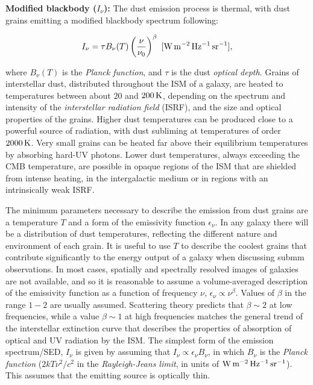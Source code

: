 \documentclass[a4paper,10pt]{article}
\begin{document}
{\noindent}\textbf{Modified blackbody ($I_\nu$):} The dust emission process is thermal, with dust grains emitting a modified blackbody spectrum following:

\begin{align*}
    I_\nu = \tau B_\nu(T) \left(\frac{\nu}{\nu_0}\right)^\beta ~ [{\rm W\,m^{-2}\,Hz^{-1}\,sr^{-1}}],
\end{align*}

{\noindent}where $B_\nu(T)$ is the \textit{Planck function}, and $\tau$ is the dust \textit{optical depth}. Grains of interstellar dust, distributed throughout the ISM of a galaxy, are heated to temperatures between about $20$ and $200\,{\rm K}$, depending on the spectrum and intensity of the \textit{interstellar radiation field} (ISRF), and the size and optical properties of the grains. Higher dust temperatures can be produced close to a powerful source of radiation, with dust subliming at temperatures of order $2000\,{\rm K}$. Very small grains can be heated far above their equilibrium temperatures by absorbing hard-UV photons. Lower dust temperatures, always exceeding the CMB temperature, are possible in opaque regions of the ISM that are shielded from intense heating, in the intergalactic medium or in regions with an intrinsically weak ISRF.

{\noindent}The minimum parameters necessary to describe the emission from dust grains are a temperature $T$ and a form of the emissivity function $\epsilon_\nu$. In any galaxy there will be a distribution of dust temperatures, reflecting the different nature and environment of each grain. It is useful to use $T$ to describe the coolest grains that contribute significantly to the energy output of a galaxy when discussing submm observations. In most cases, spatially and spectrally resolved images of galaxies are not available, and so it is reasonable to assume a volume-averaged description of the emissivity function as a function of frequency $\nu$, $\epsilon_\nu\propto\nu^\beta$. Values of $\beta$ in the range $1-2$ are usually assumed. Scattering theory predicts that  $\beta\sim2$ at low frequencies, while a value $\beta\sim1$ at high frequencies matches the general trend of the interstellar extinction curve that describes the properties of absorption of optical and UV radiation by the ISM. The simplest form of the emission spectrum/SED, $I_\nu$ is given by assuming that $I_\nu\propto\epsilon_\nu B_\nu$, in which $B_\nu$ is the \textit{Planck function} ($2kT\nu^2/c^2$ in the \textit{Rayleigh-Jeans limit}, in units of $\rm W\,m^{-2}\,Hz^{-1}\,sr^{-1}$). This assumes that the emitting source is optically thin. 
\end{document}
